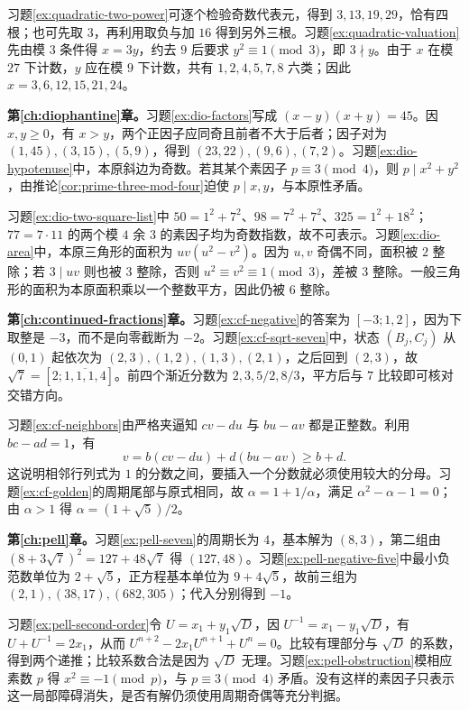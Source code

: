 习题\ref{ex:quadratic-two-power}可逐个检验奇数代表元，得到 $3,13,19,29$，恰有四根；也可先取 $3$，再利用取负与加 $16$ 得到另外三根。习题\ref{ex:quadratic-valuation}先由模 $3$ 条件得 $x=3y$，约去 $9$ 后要求 $y^2\equiv1\pmod3$，即 $3\nmid y$。由于 $x$ 在模 $27$ 下计数，$y$ 应在模 $9$ 下计数，共有 $1,2,4,5,7,8$ 六类；因此 $x=3,6,12,15,21,24$。

\textbf{第\ref{ch:diophantine}章。}习题\ref{ex:dio-factors}写成 $(x-y)(x+y)=45$。因 $x,y\ge0$，有 $x>y$，两个正因子应同奇且前者不大于后者；因子对为 $(1,45),(3,15),(5,9)$，得到 $(23,22),(9,6),(7,2)$。习题\ref{ex:dio-hypotenuse}中，本原斜边为奇数。若其某个素因子 $p\equiv3\pmod4$，则 $p\mid x^2+y^2$，由推论\ref{cor:prime-three-mod-four}迫使 $p\mid x,y$，与本原性矛盾。

习题\ref{ex:dio-two-square-list}中 $50=1^2+7^2$、$98=7^2+7^2$、$325=1^2+18^2$；$77=7\cdot11$ 的两个模 $4$ 余 $3$ 的素因子均为奇数指数，故不可表示。习题\ref{ex:dio-area}中，本原三角形的面积为 $uv(u^2-v^2)$。因为 $u,v$ 奇偶不同，面积被 $2$ 整除；若 $3\mid uv$ 则也被 $3$ 整除，否则 $u^2\equiv v^2\equiv1\pmod3$，差被 $3$ 整除。一般三角形的面积为本原面积乘以一个整数平方，因此仍被 $6$ 整除。

\textbf{第\ref{ch:continued-fractions}章。}习题\ref{ex:cf-negative}的答案为 $[-3;1,2]$，因为下取整是 $-3$，而不是向零截断为 $-2$。习题\ref{ex:cf-sqrt-seven}中，状态 $(B_j,C_j)$ 从 $(0,1)$ 起依次为 $(2,3),(1,2),(1,3),(2,1)$，之后回到 $(2,3)$，故 $\sqrt7=[2;\overline{1,1,1,4}]$。前四个渐近分数为 $2,3,5/2,8/3$，平方后与 $7$ 比较即可核对交错方向。

习题\ref{ex:cf-neighbors}由严格夹逼知 $cv-du$ 与 $bu-av$ 都是正整数。利用 $bc-ad=1$，有
\[
 v=b(cv-du)+d(bu-av)\ge b+d.
\]
这说明相邻行列式为 $1$ 的分数之间，要插入一个分数就必须使用较大的分母。习题\ref{ex:cf-golden}的周期尾部与原式相同，故 $\alpha=1+1/\alpha$，满足 $\alpha^2-\alpha-1=0$；由 $\alpha>1$ 得 $\alpha=(1+\sqrt5)/2$。

\textbf{第\ref{ch:pell}章。}习题\ref{ex:pell-seven}的周期长为 $4$，基本解为 $(8,3)$，第二组由 $(8+3\sqrt7)^2=127+48\sqrt7$ 得 $(127,48)$。习题\ref{ex:pell-negative-five}中最小负范数单位为 $2+\sqrt5$，正方程基本单位为 $9+4\sqrt5$，故前三组为 $(2,1),(38,17),(682,305)$；代入分别得到 $-1$。

习题\ref{ex:pell-second-order}令 $U=x_1+y_1\sqrt D$，因 $U^{-1}=x_1-y_1\sqrt D$，有 $U+U^{-1}=2x_1$，从而 $U^{n+2}-2x_1U^{n+1}+U^n=0$。比较有理部分与 $\sqrt D$ 的系数，得到两个递推；比较系数合法是因为 $\sqrt D$ 无理。习题\ref{ex:pell-obstruction}模相应素数 $p$ 得 $x^2\equiv-1\pmod p$，与 $p\equiv3\pmod4$ 矛盾。没有这样的素因子只表示这一局部障碍消失，是否有解仍须使用周期奇偶等充分判据。


